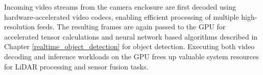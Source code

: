 \documentclass{erauthesis}
\begin{document}
Incoming video streams from the camera enclosure are first decoded using hardware-accelerated video codecs, enabling efficient processing of multiple high-resolution feeds.
The resulting frames are again passed to the GPU for accelerated tensor calculations and neural network based algorithms described in Chapter \ref{realtime_object_detection} for object detection.
Executing both video decoding and inference workloads on the GPU frees up valuable system resources for LiDAR processing and sensor fusion tasks.





\end{document}

